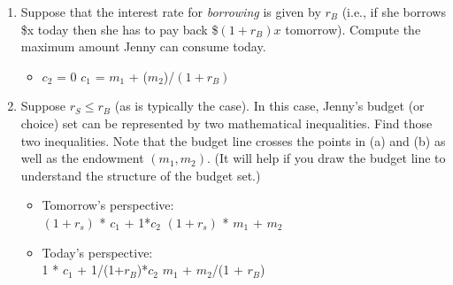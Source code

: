 \documentclass[11pt]{article}
\begin{document}
\begin{enumerate}
\begin{enumerate}
        \item Suppose that the interest rate for \emph{borrowing} is given by $r_{B}$ (i.e., if she borrows \$x today then she has to pay back \$$(1+r_{B})x$ tomorrow). Compute the maximum amount Jenny can consume today.
        \begin{itemize}
            \item $c_{2}$ = 0 \hspace{1cm} \Rightarrow \hspace{1cm} $c_{1}$ = $m_{1}$ + ($m_{2}$)/$(1 + r_{B})$
        \end{itemize}

        \item Suppose $r_{S}\leq r_{B}$ (as is typically the case). In this case, Jenny's budget (or choice) set can be represented by two mathematical inequalities. Find those two inequalities. Note that the budget line crosses the points in (a) and (b) as well as the endowment $(m_{1},m_{2})$. (It will help if you draw the budget line to understand the structure of the budget set.)
        \begin{itemize}
            \item Tomorrow’s perspective:\\
            $(1 + r_{s})$ * $c_{1}$ + 1*$c_{2}$ \hspace{1cm} \leq \hspace{1cm} $(1 + r_{s})$ * $m_{1}$ + $m_{2}$
            \item Today’s perspective: \\
            1 * $c_{1}$ + 1/(1+$r_{B}$)*$c_{2}$ \hspace{1.1cm} \leq \hspace{1cm} $m_{1}$ + $m_{2}$/(1 + $r_{B}$)
        \end{itemize}
    \end{enumerate}


\end{enumerate}
\end{document}
